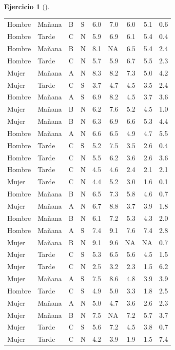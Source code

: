 \documentclass[
  a4paper,
]{scrreport}
\theoremstyle{definition}
\newtheorem{exercise}{Ejercicio}[chapter]
\theoremstyle{remark}
\begin{document}
\begin{exercise}[]
\begin{enumerate}
\begin{tcolorbox}
\begin{longtable}[]{@{}llllrrrrr@{}}
  Hombre & Mañana & B & S & 6.0 & 7.0 & 6.0 & 5.1 & 0.6 \\
  Hombre & Tarde & C & N & 5.9 & 6.9 & 6.1 & 5.4 & 0.4 \\
  Hombre & Mañana & B & N & 8.1 & NA & 6.5 & 5.4 & 2.4 \\
  Hombre & Tarde & C & N & 5.7 & 5.9 & 6.7 & 5.5 & 2.3 \\
  Mujer & Mañana & A & N & 8.3 & 8.2 & 7.3 & 5.0 & 4.2 \\
  Mujer & Tarde & C & S & 3.7 & 4.7 & 4.5 & 3.5 & 2.4 \\
  Hombre & Mañana & A & S & 6.9 & 8.2 & 4.5 & 3.7 & 3.6 \\
  Mujer & Mañana & B & N & 6.2 & 7.6 & 5.2 & 4.5 & 1.0 \\
  Mujer & Mañana & B & N & 6.3 & 6.9 & 6.6 & 5.3 & 4.4 \\
  Hombre & Mañana & A & N & 6.6 & 6.5 & 4.9 & 4.7 & 5.5 \\
  Hombre & Tarde & C & S & 5.2 & 7.5 & 3.5 & 2.6 & 0.4 \\
  Hombre & Tarde & C & N & 5.5 & 6.2 & 3.6 & 2.6 & 3.6 \\
  Hombre & Tarde & C & N & 4.5 & 4.6 & 2.4 & 2.1 & 2.1 \\
  Mujer & Tarde & C & N & 4.4 & 5.2 & 3.0 & 1.6 & 0.1 \\
  Hombre & Mañana & B & N & 6.5 & 7.3 & 5.8 & 4.6 & 0.7 \\
  Mujer & Mañana & A & N & 6.7 & 8.8 & 3.7 & 3.9 & 1.8 \\
  Hombre & Mañana & B & N & 6.1 & 7.2 & 5.3 & 4.3 & 2.0 \\
  Hombre & Mañana & A & S & 7.4 & 9.1 & 7.6 & 7.4 & 2.8 \\
  Mujer & Mañana & B & N & 9.1 & 9.6 & NA & NA & 0.7 \\
  Mujer & Tarde & C & S & 5.3 & 6.5 & 5.6 & 4.5 & 1.5 \\
  Mujer & Tarde & C & N & 2.5 & 3.2 & 2.3 & 1.5 & 6.2 \\
  Mujer & Mañana & A & S & 7.5 & 8.6 & 4.8 & 3.9 & 3.9 \\
  Hombre & Tarde & C & S & 4.9 & 5.0 & 3.3 & 1.8 & 2.5 \\
  Mujer & Mañana & A & N & 5.0 & 4.7 & 3.6 & 2.6 & 2.3 \\
  Mujer & Mañana & B & N & 7.5 & NA & 7.2 & 5.7 & 3.7 \\
  Mujer & Tarde & C & S & 5.6 & 7.2 & 4.5 & 3.8 & 0.7 \\
  Mujer & Tarde & C & N & 4.2 & 3.9 & 1.9 & 1.5 & 7.4 \\

\end{longtable}
\end{tcolorbox}
\end{enumerate}
\end{exercise}
\end{document}
